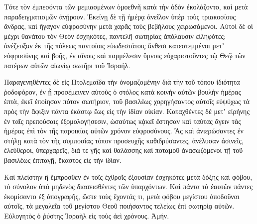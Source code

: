 {\par }{\PP {}Τότε τὸν ἐμπεσόντα τῶν μεμιασμένων ὁμοεθνῆ κατὰ τὴν ὁδὸν ἐκολάζοντο, καὶ μετὰ παραδειγματισμῶν ἀνῄρουν.
Ἐκείνῃ δὲ τῇ ἡμέρᾳ ἀνεῖλον ὑπὲρ τοὺς τριακοσίους ἄνδρας, καὶ ἤγαγον εὐφροσύνην μετὰ χαρᾶς τοὺς βεβήλους χειρωσάμενοι.
Αὐτοὶ δὲ οἱ μέχρι θανάτου τὸν Θεὸν ἐσχηκότες, παντελῆ σωτηρίας ἀπόλαυσιν εἰληφότες; ἀνέζευξαν ἐκ τῆς πόλεως παντοίοις εὐωδεστάτοις ἄνθεσι κατεστεμμένοι μετʼ εὐφροσύνης καὶ βοῆς, ἐν αἴνοις καὶ παμμέλεσιν ὕμνοις εὐχαριστοῦντες τῷ Θεῷ τῶν πατέρων αὐτῶν αἰωνίῳ σωτῆρι τοῦ Ἰσραήλ.
\par }{\PP {}Παραγενηθέντες δὲ εἰς Πτολεμαΐδα τὴν ὀνομαζομένην διὰ τὴν τοῦ τόπου ἰδιότητα ῥοδοφόρον, ἐν ᾗ προσέμεινεν αὐτοὺς ὁ στόλος κατὰ κοινὴν αὐτῶν βουλὴν ἡμέρας ἑπτὰ,
ἐκεῖ ἐποίησαν πότον σωτήριον, τοῦ βασιλέως χορηγήσαντος αὐτοῖς εὐψύχως τὰ πρὸς τὴν ἄφιξιν πάντα ἑκάστῳ ἕως εἰς τὴν ἰδίαν οἰκίαν.
Καταχθέντες δὲ μετʼ εἰρήνης ἐν ταῖς πρεπούσαις ἐξομολογήσεσιν, ὡσαύτως κᾀκεῖ ἔστησαν καὶ ταύτας ἄγειν τὰς ἡμέρας ἐπὶ τὸν τῆς παροικίας αὐτῶν χρόνον εὐφροσύνους.
Ἃς καὶ ἀνιερώσαντες ἐν στήλῃ κατὰ τὸν τῆς συμποσίας τόπον προσευχῆς καθιδρύσαντες, ἀνέλυσαν ἀσινεῖς, ἐλεύθεροι, ὑπερχαρεῖς, διά τε γῆς καὶ θαλάσσης καὶ ποταμοῦ ἀνασωζόμενοι τῇ τοῦ βασιλέως ἐπιταγῇ, ἕκαστος εἰς τὴν ἰδίαν.
\par }{\PP {}Καὶ πλείστην ἢ ἔμπροσθεν ἐν τοῖς ἐχθροῖς ἐξουσίαν ἐσχηκότες μετὰ δόξης καὶ φόβου, τὸ σύνολον ὑπὸ μηδενὸς διασεισθέντες τῶν ὑπαρχόντων.
Καὶ πάντα τὰ ἑαυτῶν πάντες ἐκομίσαντο ἐξ ἀπογραφῆς, ὥστε τοὺς ἔχοντάς τι, μετὰ φόβου μεγίστου ἀποδοῦναι αὐτοῖς, τὰ μεγαλεῖα τοῦ μεγίστου Θεοῦ ποιήσαντος τελείως ἐπὶ σωτηρίᾳ αὐτῶν.
Εὐλογητὸς ὁ ῥύστης Ἰσραὴλ εἰς τοὺς ἀεὶ χρόνους. Ἀμήν.
\par }